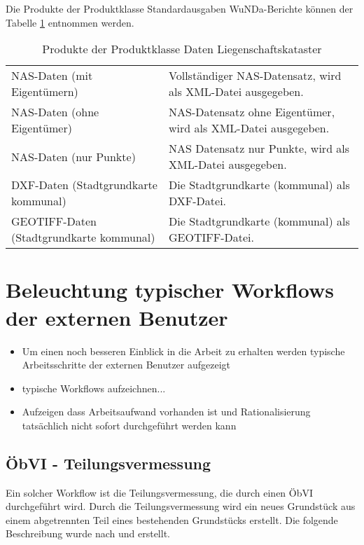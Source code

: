 Die Produkte der Produktklasse Standardausgaben WuNDa-Berichte können der Tabelle \ref{tab-daten-kataster} entnommen werden.
\begin{longtable}{|p{}|p{}|}
	\caption{Produkte der Produktklasse Daten Liegenschaftskataster} \label{tab-daten-kataster} \\
	\hline 
	\head{Produktname}  & \head{Beschreibung} \tabularnewline
	\hline 
	\endhead	
				
	\acs{NAS}-Daten (mit Eigentümern)
	&
	Vollständiger \acs{NAS}-Datensatz, wird als \acs{XML}-Datei ausgegeben. \\
	\hline
	\acs{NAS}-Daten (ohne Eigentümer)
	&
	\acs{NAS}-Datensatz ohne Eigentümer, wird als \acs{XML}-Datei ausgegeben. \\
	\hline
	\acs{NAS}-Daten (nur Punkte)
	&
	\acs{NAS} Datensatz nur Punkte, wird als \acs{XML}-Datei ausgegeben. \\
	\hline
	\acs{DXF}-Daten (Stadtgrundkarte kommunal)
	&
	Die Stadtgrundkarte (kommunal) als \acs{DXF}-Datei.  \\
	\hline
	GEOTIFF-Daten (Stadtgrundkarte kommunal)
	&
	Die Stadtgrundkarte (kommunal) als GEOTIFF-Datei. \\
	\hline	
\end{longtable} 

\section{Beleuchtung typischer Workflows der externen Benutzer}
\begin{itemize}
	\item Um einen noch besseren Einblick in die Arbeit zu erhalten werden typische Arbeitsschritte der externen Benutzer aufgezeigt
	\item typische Workflows aufzeichnen...
	\item Aufzeigen dass Arbeitsaufwand vorhanden ist und Rationalisierung tatsächlich nicht sofort durchgeführt werden kann
\end{itemize}

\subsection{\ac{ÖbVI} - Teilungsvermessung}
Ein solcher Workflow ist die Teilungsvermessung, die durch einen \ac{ÖbVI} durchgeführt wird. Durch die Teilungsvermessung wird ein neues Grundstück aus einem abgetrennten Teil eines bestehenden Grundstücks erstellt. Die folgende Beschreibung wurde nach \autocite{klein-vermessung} und \autocite{jungemann-alltag} erstellt.

